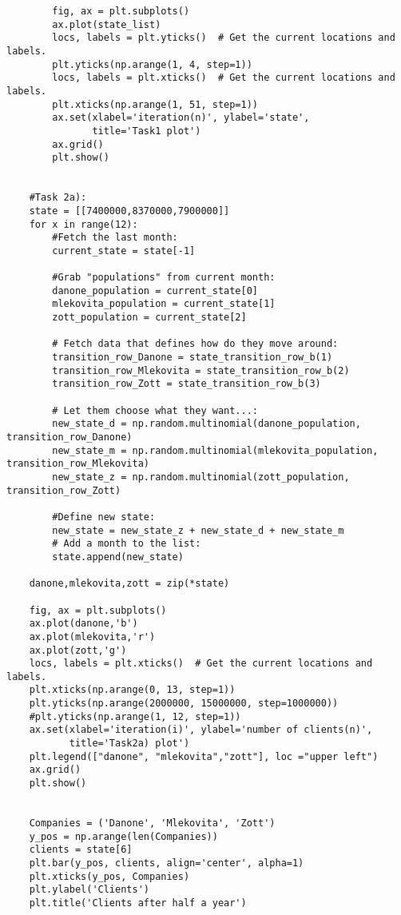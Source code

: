 \documentclass[a4paper]{article}
\begin{document}
\begin{lstlisting}
        fig, ax = plt.subplots()
        ax.plot(state_list)
        locs, labels = plt.yticks()  # Get the current locations and labels.
        plt.yticks(np.arange(1, 4, step=1))
        locs, labels = plt.xticks()  # Get the current locations and labels.
        plt.xticks(np.arange(1, 51, step=1))
        ax.set(xlabel='iteration(n)', ylabel='state',
               title='Task1 plot')
        ax.grid()
        plt.show()


    #Task 2a):
    state = [[7400000,8370000,7900000]]
    for x in range(12):
        #Fetch the last month:
        current_state = state[-1]

        #Grab "populations" from current month:
        danone_population = current_state[0]
        mlekovita_population = current_state[1]
        zott_population = current_state[2]

        # Fetch data that defines how do they move around:
        transition_row_Danone = state_transition_row_b(1)
        transition_row_Mlekovita = state_transition_row_b(2)
        transition_row_Zott = state_transition_row_b(3)

        # Let them choose what they want...:
        new_state_d = np.random.multinomial(danone_population, transition_row_Danone)
        new_state_m = np.random.multinomial(mlekovita_population, transition_row_Mlekovita)
        new_state_z = np.random.multinomial(zott_population, transition_row_Zott)

        #Define new state:
        new_state = new_state_z + new_state_d + new_state_m
        # Add a month to the list:
        state.append(new_state)

    danone,mlekovita,zott = zip(*state)

    fig, ax = plt.subplots()
    ax.plot(danone,'b')
    ax.plot(mlekovita,'r')
    ax.plot(zott,'g')
    locs, labels = plt.xticks()  # Get the current locations and labels.
    plt.xticks(np.arange(0, 13, step=1))
    plt.yticks(np.arange(2000000, 15000000, step=1000000))
    #plt.yticks(np.arange(1, 12, step=1))
    ax.set(xlabel='iteration(i)', ylabel='number of clients(n)',
           title='Task2a) plot')
    plt.legend(["danone", "mlekovita","zott"], loc ="upper left")
    ax.grid()
    plt.show()


    Companies = ('Danone', 'Mlekovita', 'Zott')
    y_pos = np.arange(len(Companies))
    clients = state[6]
    plt.bar(y_pos, clients, align='center', alpha=1)
    plt.xticks(y_pos, Companies)
    plt.ylabel('Clients')
    plt.title('Clients after half a year')


\end{lstlisting}
\end{document}
